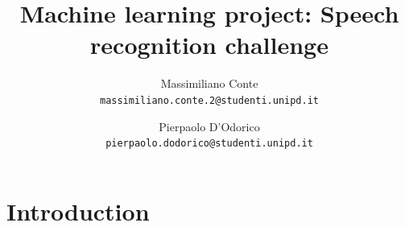 \documentclass[10pt,twocolumn,letterpaper]{article}
\begin{document}
\title{Machine learning project: Speech recognition challenge}

\author{Massimiliano Conte\\
{\tt\small massimiliano.conte.2@studenti.unipd.it}
\and
Pierpaolo D'Odorico\\
{\tt\small pierpaolo.dodorico@studenti.unipd.it}
}

\maketitle


\section{Introduction}
\end{document}
